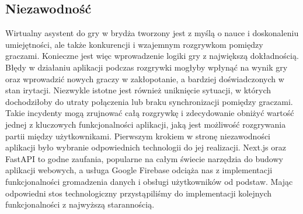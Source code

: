 \subsection{Niezawodność}
Wirtualny asystent do gry w brydża tworzony jest z myślą o nauce i doskonaleniu umiejętności, ale także konkurencji i wzajemnym rozgrywkom pomiędzy graczami. Konieczne jest więc wprowadzenie logiki gry z największą dokładnością. Błędy w działaniu aplikacji podczas rozgrywki mogłyby wpłynąć na wynik gry oraz wprowadzić nowych graczy w zakłopotanie, a bardziej doświadczonych w stan irytacji. Niezwykle istotne jest również uniknięcie sytuacji, w których dochodziłoby do utraty połączenia lub braku synchronizacji pomiędzy graczami. Takie incydenty mogą zrujnować całą rozgrywkę i zdecydowanie obniżyć wartość jednej z kluczowych funkcjonalności aplikacji, jaką jest możliwość rozgrywania partii między użytkownikami. Pierwszym krokiem w stronę niezawodności aplikacji było wybranie odpowiednich technologii do jej realizacji. Next.js oraz FastAPI to godne zaufania, popularne na całym świecie narzędzia do budowy aplikacji webowych, a usługa Google Firebase odciąża nas z implementacji funkcjonalności gromadzenia danych i obsługi użytkowników od podstaw. Mając odpowiedni stos technologiczny przystąpiliśmy do implementacji kolejnych funkcjonalności z najwyższą starannością. 

